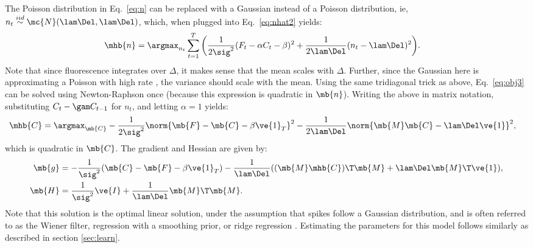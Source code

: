 The Poisson distribution in Eq.~\eqref{eq:n} can be replaced with a Gaussian instead of a Poisson distribution, ie,  $n_t \overset{iid}{\sim} \mc{N}(\lam \Del, \lam \Del)$, which, when plugged into Eq.~\eqref{eq:nhat2} yields:
\begin{align} \label{eq:obj5}
\mhb{n} &= \argmax_{n_t}  \sum_{t=1}^T \bigg( \frac{1}{2 \sig^2}(F_t - \alpha C_t - \beta)^2  + 
 \frac{1}{2 \lam \Del}(n_t - \lam \Del)^2\bigg).
\end{align}
Note that since fluorescence integrates over $\Delta$, it makes sense that the mean scales with $\Delta$.  Further, since the Gaussian here is approximating a Poisson with high rate \cite{SjulsonMiesenbock07}, the variance should scale with the mean.  Using the same tridiagonal trick as above, Eq.~\eqref{eq:obj3} can be solved using Newton-Raphson once (because this expression is quadratic in $\mb{n}$).  Writing the above in matrix notation, substituting $C_t - \gam C_{t-1}$ for $n_t$, and letting $\alpha=1$ yields:
\begin{align}   \label{eq:w2}
\mhb{C}&= \argmax_{\mb{C}} -\frac{1}{2\sig^2} \norm{\mb{F} - \mb{C} - \beta\ve{1}_T}^2 - \frac{1}{2\lam\Del} \norm{\mb{M} \mb{C} - \lam\Del\ve{1}}^2,
\end{align}
\noindent which is quadratic in $\mb{C}$.  The gradient and Hessian are given by:
\begin{align}
\mb{g} &= -\frac{1}{\sig^2} (\mb{C} - \mb{F} - \beta\ve{1}_T) - \frac{1}{\lam\Del} ( (\mb{M} \mhb{C})\T \mb{M} + \lam\Del \mb{M}\T \ve{1}), \\
\mb{H} &= \frac{1}{\sig^2} \ve{I} + \frac{1}{\lam\Del} \mb{M}\T \mb{M}.
\end{align}
Note that this solution is the optimal linear solution, under the assumption that spikes follow a Gaussian distribution, and is often referred to as the Wiener filter, regression with a smoothing prior, or ridge regression \cite{CONV04}.  Estimating the parameters for this model follows similarly as described in section \ref{sec:learn}.
